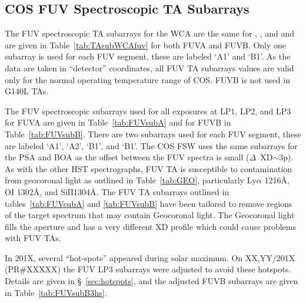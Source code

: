 \subsection{COS FUV Spectroscopic TA Subarrays}\label{subsec:FUVsupSUBS}
The FUV spectroscopic TA subarrays for the WCA are the same for ,  , and 
and are given in Table~\ref{tab:TAsubWCAfuv} for both FUVA and FUVB.
Only one subarray is used for each FUV segment, these are labeled `A1' and `B1'.
As the data are taken in ``detector'' coordinates, all FUV TA subarrays values are valid only for the normal operating temperature range of COS. FUVB is not used in G140L TAs.

The FUV spectroscopic subarrays used for all exposures at LP1, LP2, and LP3 for FUVA are given in Table~\ref{tab:FUVsubA} and for FUVB in Table~\ref{tab:FUVsubB}.
There are two subarrays used for each FUV segment, these are labeled `A1', `A2', `B1', and `B1'.
The COS FSW uses the same subarrays for the PSA and BOA as the offset between the FUV spectra is small ($\Delta$~XD$\sim$3p).
As with the other HST spectrographs, FUV TA is susceptible to contamination from geocoronal light as outlined in
Table~\ref{tab:GEO}, particularly Ly$\alpha$ 1216\AA, {\rm O}\textsc{I} 1302\AA, and {\rm Si}{\sc II}1304\AA.
The FUV TA subarrays outlined in tables~\ref{tab:FUVsubA} and \ref{tab:FUVsubB} have been tailored to remove regions
of the target spectrum that may contain Geocoronal light.
The Geocoronal light fills the aperture and has a very different XD profile which could cause problems with FUV TAs.

In 201X, several ``hot-spots'' appeared during solar maximum.
On XX,YY/201X (PR\#XXXXX) the FUV LP3 subarrays were adjusted to avoid these hotspots.
Details are given in \S~\ref{sec:hotspots}, and the adjusted FUVB subarrays are given in Table~\ref{tab:FUVsubB3hs}.

